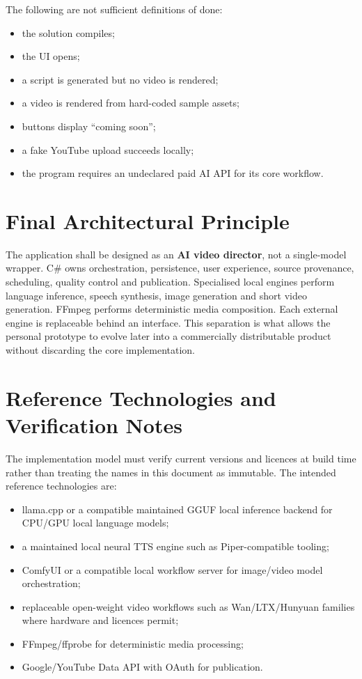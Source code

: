\documentclass[10pt,journal,compsoc]{IEEEtran}
\begin{document}
The following are not sufficient definitions of done:
\begin{itemize}
    \item the solution compiles;
    \item the UI opens;
    \item a script is generated but no video is rendered;
    \item a video is rendered from hard-coded sample assets;
    \item buttons display ``coming soon'';
    \item a fake YouTube upload succeeds locally;
    \item the program requires an undeclared paid AI API for its core workflow.
\end{itemize}

\section{Final Architectural Principle}

The application shall be designed as an \textbf{AI video director}, not a single-model wrapper. C\# owns orchestration, persistence, user experience, source provenance, scheduling, quality control and publication. Specialised local engines perform language inference, speech synthesis, image generation and short video generation. FFmpeg performs deterministic media composition. Each external engine is replaceable behind an interface. This separation is what allows the personal prototype to evolve later into a commercially distributable product without discarding the core implementation.

\section{Reference Technologies and Verification Notes}

The implementation model must verify current versions and licences at build time rather than treating the names in this document as immutable. The intended reference technologies are:
\begin{itemize}
    \item llama.cpp or a compatible maintained GGUF local inference backend for CPU/GPU local language models;
    \item a maintained local neural TTS engine such as Piper-compatible tooling;
    \item ComfyUI or a compatible local workflow server for image/video model orchestration;
    \item replaceable open-weight video workflows such as Wan/LTX/Hunyuan families where hardware and licences permit;
    \item FFmpeg/ffprobe for deterministic media processing;
    \item Google/YouTube Data API with OAuth for publication.
\end{itemize}
\end{document}
